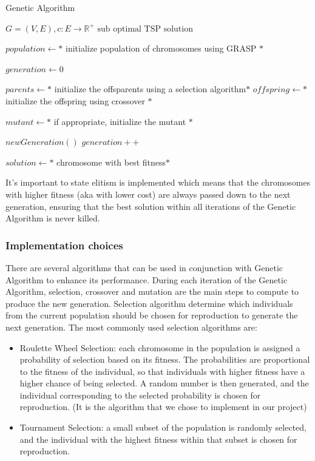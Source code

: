 \begin{algorithm}
    \caption{Genetic Algorithm}\label{algo:genetic}
    \begin{algorithmic}[1]
    \Require $G = (V,E), c:E \to \mathbb{R}^+$
    \Ensure $\text{sub optimal TSP solution}$
    
    \State $population \gets *$ initialize population of chromosomes using GRASP $*$

    \State $ generation \gets 0$


        \State $parents \gets *$ initialize the offsparents  using a selection algorithm$*$
        \State $offspring \gets *$ initialize the offspring using crossover $*$

        \State $mutant \gets *$ if appropriate, initialize the mutant $*$

        \State $ newGeneration() $
        \State $ generation++ $

    \EndWhile

    \State $ solution \gets *$ chromosome with best fitness$*$

    

    \end{algorithmic}
\end{algorithm}

It's important to state elitism is implemented which means that the chromosomes with higher fitness (aka with lower cost) are always passed down to the next generation, ensuring that the best solution within all iterations of the Genetic Algorithm is never killed. 

\subsubsection{Implementation choices}
There are several algorithms that can be used in conjunction with Genetic Algorithm to enhance its performance.
During each iteration of the Genetic Algorithm, selection, crossover and mutation are the main steps to compute to produce the new generation.
Selection algorithm determine which individuals from the current population should be chosen for reproduction to generate the next generation. The most commonly used selection algorithms are:

\begin{itemize}
    \item Roulette Wheel Selection: each chromosome in the population is assigned a probability of selection based on its fitness. The probabilities are proportional to the fitness of the individual, so that individuals with higher fitness have a higher chance of being selected. A random number is then generated, and the individual corresponding to the selected probability is chosen for reproduction. (It is the algorithm that we chose to implement in our project)
    \item Tournament Selection: a small subset of the population is randomly selected, and the individual with the highest fitness within that subset is chosen for reproduction.
\end{itemize}


